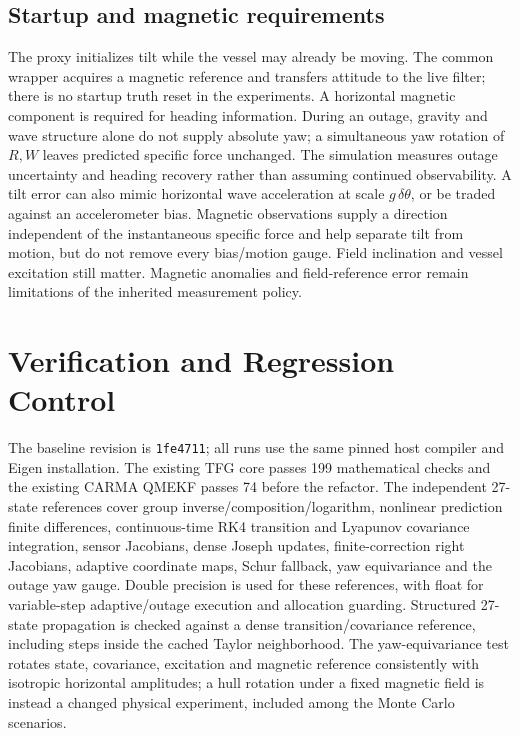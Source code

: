 \documentclass[conference]{IEEEtran}
\begin{document}
\subsection{Startup and magnetic requirements}
The proxy initializes tilt while the vessel may already be moving. The common
wrapper acquires a magnetic reference and transfers attitude to the live filter;
there is no startup truth reset in the experiments. A horizontal magnetic
component is required for heading information. During an outage, gravity and
wave structure alone do not supply absolute yaw; a simultaneous yaw rotation of
$R,W$ leaves predicted specific force unchanged. The simulation measures outage
uncertainty and heading recovery rather than assuming continued observability.
A tilt error can also mimic horizontal wave acceleration at scale
$g\,\delta\theta$, or be traded against an accelerometer bias. Magnetic
observations supply a direction independent of the instantaneous specific
force and help separate tilt from motion, but do not remove every bias/motion
gauge. Field inclination and vessel excitation still matter. Magnetic
anomalies and field-reference error remain limitations of the inherited
measurement policy.

\section{Verification and Regression Control}
The baseline revision is \texttt{1fe4711}; all runs use the same pinned host
compiler and Eigen installation. The existing TFG core passes 199 mathematical
checks and the existing CARMA QMEKF passes 74 before the refactor.
The independent 27-state references cover group inverse/composition/logarithm,
nonlinear prediction finite differences, continuous-time RK4 transition and
Lyapunov covariance integration, sensor Jacobians, dense Joseph updates,
finite-correction right Jacobians, adaptive coordinate maps, Schur fallback,
yaw equivariance and the outage yaw gauge. Double precision is used for these
references, with float for variable-step adaptive/outage execution and
allocation guarding. Structured 27-state propagation is checked against a
dense transition/covariance reference, including steps inside the cached
Taylor neighborhood. The yaw-equivariance test rotates state, covariance,
excitation and magnetic reference consistently with isotropic horizontal
amplitudes; a hull rotation under a fixed magnetic field is instead a
changed physical experiment, included among the Monte Carlo scenarios. \VerificationResults
\end{document}
